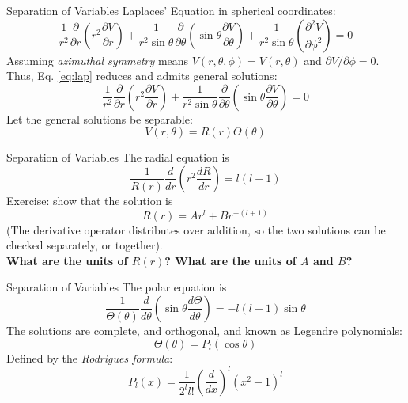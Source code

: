\documentclass{beamer}
\begin{document}
\begin{frame}{Separation of Variables}
\small
Laplaces' Equation in spherical coordinates:
\begin{equation}
\frac{1}{r^2}\frac{\partial}{\partial r} \left( r^2 \frac{\partial V}{\partial r}\right) + \frac{1}{r^2\sin\theta}\frac{\partial}{\partial \theta} \left( \sin\theta \frac{\partial V}{\partial \theta}\right) + \frac{1}{r^2\sin\theta}\left(\frac{\partial^2 V}{\partial \phi^2}\right) = 0 \label{eq:lap}
\end{equation}
Assuming \textit{azimuthal symmetry} means $V(r,\theta,\phi) = V(r,\theta)$ and $\partial V/ \partial \phi = 0$.  Thus, Eq. \ref{eq:lap} reduces and admits general solutions:
\begin{equation}
\frac{1}{r^2}\frac{\partial}{\partial r} \left( r^2 \frac{\partial V}{\partial r}\right) + \frac{1}{r^2\sin\theta}\frac{\partial}{\partial \theta} \left( \sin\theta \frac{\partial V}{\partial \theta}\right) = 0 \label{eq:lap2}
\end{equation}
Let the general solutions be separable:
\begin{equation}
V(r,\theta) = R(r) \Theta (\theta)
\end{equation}
\end{frame}

\begin{frame}{Separation of Variables}
The radial equation is
\begin{equation}
\frac{1}{R(r)} \frac{d}{dr}\left(r^2 \frac{dR}{dr} \right) = l(l+1)
\end{equation}
Exercise: show that the solution is 
\begin{equation}
R(r) = A r^l + B r^{-(l+1)}
\end{equation}
(The derivative operator distributes over addition, so the two solutions can be checked separately, or together). \\ \vspace{0.5cm}
\textbf{What are the units of $R(r)$?  What are the units of $A$ and $B$?}
\end{frame}

\begin{frame}{Separation of Variables}
The polar equation is
\begin{equation}
\frac{1}{\Theta(\theta)}\frac{d}{d\theta}\left(\sin\theta \frac{d\Theta}{d\theta} \right) = -l(l+1)\sin\theta
\end{equation}
The solutions are \alert{complete}, and \alert{orthogonal}, and known as Legendre polynomials:
\begin{equation}
\Theta(\theta) = P_l(\cos\theta)
\end{equation}
Defined by the \textit{Rodrigues formula}:
\begin{equation}
P_l(x) = \frac{1}{2^ll!} \left(\frac{d}{dx}\right)^l (x^2 -1)^l
\end{equation}
\end{frame}
\end{document}
